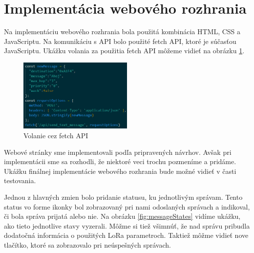 \documentclass[slovak,master]{diploma}
\begin{document}
\section{Implementácia webového rozhrania}
Na implementáciu webového rozhrania bola použitá kombinácia HTML, CSS a JavaScriptu. Na komunikáciu s API bolo použité fetch API, 
ktoré je súčasťou JavaScriptu. Ukážku volania za použitia fetch API môžeme vidieť na obrázku \ref{fig:fetchApi}.

\begin{figure}[h!]
  \centering
  \includegraphics[width=0.5\textwidth]{Figures/fetchApi.png}
  \caption{Volanie cez fetch API}
  \label{fig:fetchApi}
\end{figure}


Webové stránky sme implementovali podľa pripravených návrhov. Avšak pri implementácii sme sa rozhodli, že 
niektoré veci trochu pozmeníme a pridáme. Ukážku finálnej implementácie webového rozhrania bude možné vidieť v časti testovania.

Jednou z hlavných zmien bolo pridanie statusu, ku jednotlivým správam. 
Tento status vo forme ikonky bol zobrazovaný pri nami odoslaných správach a indikoval, či bola správa prijatá alebo nie. 
Na obrázku \ref{fig:messageStates} vidíme ukážku, ako tieto jednotlive stavy vyzerali. Môžme si tiež všimnúť, že nad správu 
pribudla dodatočná informácia o použitých LoRa parametroch. Taktiež môžme vidieť nove tlačítko, ktoré sa zobrazovalo pri 
neúspešných správach.
\end{document}
